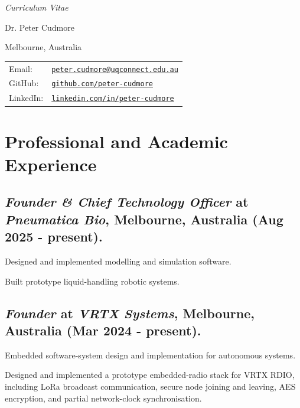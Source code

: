 \documentclass[letterpaper]{article}
\def\name{Dr. Peter Cudmore}
\renewenvironment{itemize}{
  \begin{list}{}{
    \setlength{\leftmargin}{1.5em}
  }
}{
  \end{list}
}
\begin{document}
{\centering\large\emph{Curriculum Vitae}\\ \hrulefill \vspace{1em}}

{ \huge \name}
\vspace{0.25in}

\begin{minipage}{0.45\linewidth}
Melbourne, Australia
\end{minipage}
\begin{minipage}{0.45\linewidth}
  {\small
  \begin{tabular}{ll}\\
    Email: & \href{mailto:peter.cudmore@uqconnect.edu.au}{\tt peter.cudmore@uqconnect.edu.au} \\
    GitHub: & \href{https://github.com/peter-cudmore}{\tt github.com/peter-cudmore} \\
    LinkedIn: & \href{https://www.linkedin.com/in/peter-cudmore/}{\tt linkedin.com/in/peter-cudmore}
  \end{tabular}
  }
\end{minipage}

\section*{Professional and Academic Experience}
\subsection*{\emph{Founder \& Chief Technology Officer} at \emph{Pneumatica Bio}, Melbourne, Australia (Aug 2025 - present).}
\begin{itemize}
	\item Designed and implemented modelling and simulation software.
	\item Built prototype liquid-handling robotic systems.
\end{itemize}

\subsection*{\emph{Founder} at \emph{VRTX Systems}, Melbourne, Australia (Mar 2024 - present).}
\begin{itemize}
	\item Embedded software-system design and implementation for autonomous systems.
	\item Designed and implemented a prototype embedded-radio stack for VRTX RDIO, including LoRa broadcast communication, secure node joining and leaving, AES encryption, and partial network-clock synchronisation.
\end{itemize}
\end{document}
